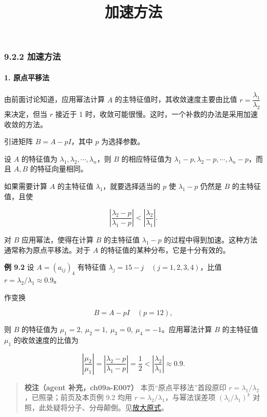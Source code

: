 \documentclass[
  10pt,
  fontset=fandol]{ctexart}
\title{加速方法}
\author{}
\date{}
\begin{document}
\maketitle

\subsubsection{9.2.2 加速方法}\label{ux52a0ux901fux65b9ux6cd5}

\paragraph{1. 原点平移法}\label{ux539fux70b9ux5e73ux79fbux6cd5}

由前面讨论知道，应用幂法计算 \(A\) 的主特征值时，其收敛速度主要由比值 \(r=\dfrac{\lambda_1}{\lambda_2}\) 来决定，但当 \(r\) 接近于 1 时，收敛可能很慢。这时，一个补救的办法是采用加速收敛的方法。

引进矩阵 \(B=A-pI\)，其中 \(p\) 为选择参数。

设 \(A\) 的特征值为 \(\lambda_1,\lambda_2,\cdots,\lambda_n\)，则 \(B\) 的相应特征值为 \(\lambda_1-p,\lambda_2-p,\cdots,\lambda_n-p\)，而且 \(A,B\) 的特征向量相同。

如果需要计算 \(A\) 的主特征值 \(\lambda_1\)，就要选择适当的 \(p\) 使 \(\lambda_1-p\) 仍然是 \(B\) 的主特征值，且使

\[
\left|\frac{\lambda_2-p}{\lambda_1-p}\right|<\left|\frac{\lambda_2}{\lambda_1}\right|.
\]

对 \(B\) 应用幂法，使得在计算 \(B\) 的主特征值 \(\lambda_1-p\) 的过程中得到加速。这种方法通常称为原点平移法。对于 \(A\) 的特征值的某种分布，它是十分有效的。

\textbf{例 9.2} 设 \(A=(a_{ij})_4\) 有特征值 \(\lambda_j=15-j\quad(j=1,2,3,4)\)，比值 \(r=\lambda_2/\lambda_1\approx0.9\)。

作变换

\[
B=A-pI\quad(p=12),
\]

则 \(B\) 的特征值为 \(\mu_1=2,\ \mu_2=1,\ \mu_3=0,\ \mu_4=-1\)。应用幂法计算 \(B\) 的主特征值 \(\mu_1\) 的收敛速度的比值为

\[
\left|\frac{\mu_2}{\mu_1}\right|=\left|\frac{\lambda_2-p}{\lambda_1-p}\right|=\frac12<\left|\frac{\lambda_2}{\lambda_1}\right|\approx0.9.
\]

\begin{quote}
\textbf{校注（agent 补充，ch09a-E007）} 本页``原点平移法''首段原印 \(r=\lambda_1/\lambda_2\)，已照录；前页及本页例 9.2 均用 \(r=\lambda_2/\lambda_1\)，与幂法误差项 \((\lambda_i/\lambda_1)^k\) 对照，此处疑将分子、分母颠倒。见\href{../assets/ch09a/review-p238-ratio.png}{放大原式}。
\end{quote}
\end{document}
